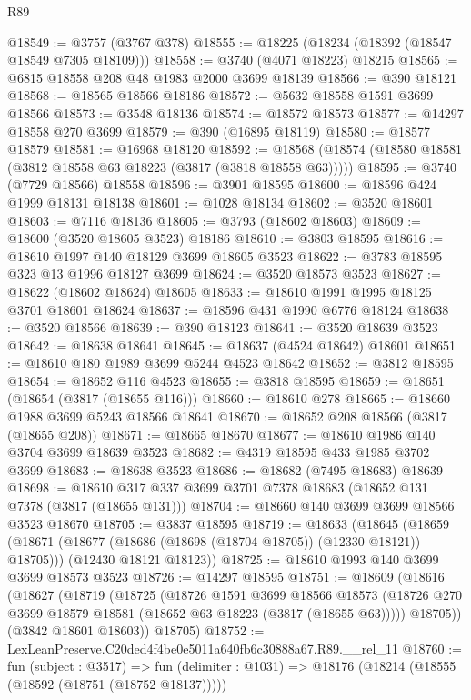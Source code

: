 \begin{lexlean}{R89}
\begin{coremodule}
@18549 := @3757 (@3767 @378)
@18555 := @18225 (@18234 (@18392 (@18547 @18549 @7305 @18109)))
@18558 := @3740 (@4071 @18223) @18215
@18565 := @6815 @18558 @208 @48 @1983 @2000 @3699 @18139
@18566 := @390 @18121
@18568 := @18565 @18566 @18186
@18572 := @5632 @18558 @1591 @3699 @18566
@18573 := @3548 @18136
@18574 := @18572 @18573
@18577 := @14297 @18558 @270 @3699
@18579 := @390 (@16895 @18119)
@18580 := @18577 @18579
@18581 := @16968 @18120
@18592 := @18568 (@18574 (@18580 @18581 (@3812 @18558 @63 @18223 (@3817 (@3818 @18558 @63)))))
@18595 := @3740 (@7729 @18566) @18558
@18596 := @3901 @18595
@18600 := @18596 @424 @1999 @18131 @18138
@18601 := @1028 @18134
@18602 := @3520 @18601
@18603 := @7116 @18136
@18605 := @3793 (@18602 @18603)
@18609 := @18600 (@3520 @18605 @3523) @18186
@18610 := @3803 @18595
@18616 := @18610 @1997 @140 @18129 @3699 @18605 @3523
@18622 := @3783 @18595 @323 @13 @1996 @18127 @3699
@18624 := @3520 @18573 @3523
@18627 := @18622 (@18602 @18624) @18605
@18633 := @18610 @1991 @1995 @18125 @3701 @18601 @18624
@18637 := @18596 @431 @1990 @6776 @18124
@18638 := @3520 @18566
@18639 := @390 @18123
@18641 := @3520 @18639 @3523
@18642 := @18638 @18641
@18645 := @18637 (@4524 @18642) @18601
@18651 := @18610 @180 @1989 @3699 @5244 @4523 @18642
@18652 := @3812 @18595
@18654 := @18652 @116 @4523
@18655 := @3818 @18595
@18659 := @18651 (@18654 (@3817 (@18655 @116)))
@18660 := @18610 @278
@18665 := @18660 @1988 @3699 @5243 @18566 @18641
@18670 := @18652 @208 @18566 (@3817 (@18655 @208))
@18671 := @18665 @18670
@18677 := @18610 @1986 @140 @3704 @3699 @18639 @3523
@18682 := @4319 @18595 @433 @1985 @3702 @3699
@18683 := @18638 @3523
@18686 := @18682 (@7495 @18683) @18639
@18698 := @18610 @317 @337 @3699 @3701 @7378 @18683 (@18652 @131 @7378 (@3817 (@18655 @131)))
@18704 := @18660 @140 @3699 @3699 @18566 @3523 @18670
@18705 := @3837 @18595
@18719 := @18633
    (@18645
      (@18659 (@18671 (@18677 (@18686 (@18698 (@18704 @18705)) (@12330 @18121)) @18705)))
      (@12430 @18121 @18123))
@18725 := @18610 @1993 @140 @3699 @3699 @18573 @3523
@18726 := @14297 @18595
@18751 := @18609
    (@18616
      (@18627
        (@18719
          (@18725
            (@18726
              @1591
              @3699
              @18566
              @18573
              (@18726 @270 @3699 @18579 @18581 (@18652 @63 @18223 (@3817 (@18655 @63)))))
            @18705))
        (@3842 @18601 @18603))
      @18705)
@18752 := LexLeanPreserve.C20ded4f4be0e5011a640fb6c30888a67.R89.__rel_11
@18760 := fun (subject : @3517) =>
  fun (delimiter : @1031) => @18176 (@18214 (@18555 (@18592 (@18751 (@18752 @18137)))))

\end{coremodule}
\end{lexlean}
